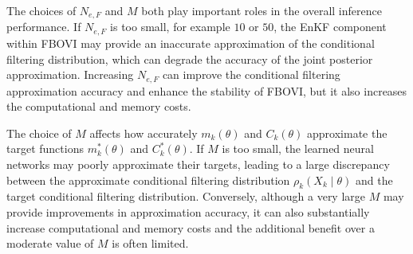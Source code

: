 \documentclass[preprint,3p,times]{elsarticle}
\begin{document}
The choices of $N_{e,F}$ and $M$ both play important roles in the overall inference performance. If $N_{e,F}$ is too small, for example $10$ or $50$, the EnKF component within FBOVI may provide an inaccurate approximation of the conditional filtering distribution, which can degrade the accuracy of the joint posterior approximation. Increasing $N_{e,F}$ can improve the conditional filtering approximation accuracy and enhance the stability of FBOVI, but it also increases the computational and memory costs.

The choice of $M$ affects how accurately $m_k(\theta)$ and $C_k(\theta)$ approximate the target functions $m_k^*(\theta)$ and $C_k^*(\theta)$. If $M$ is too small, the learned neural networks may poorly approximate their targets, leading to a large discrepancy between the approximate conditional filtering distribution $\rho_k(X_k \mid \theta)$ and the target conditional filtering distribution. Conversely, although a very large $M$ may provide improvements in approximation accuracy, it can also substantially increase computational and memory costs and the additional benefit over a moderate value of $M$ is often limited.
\end{document}
